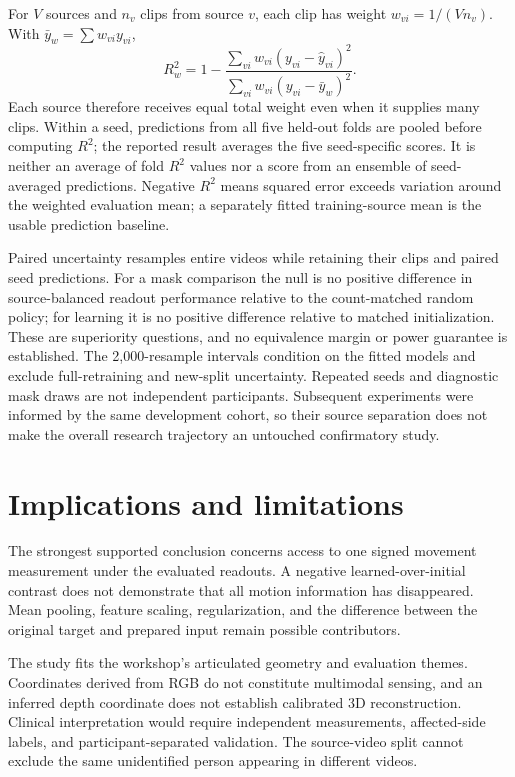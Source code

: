 \documentclass{article}
\begin{document}
For \(V\) sources and \(n_v\) clips from source \(v\), each clip has weight \(w_{vi}=1/(Vn_v)\). With \(\bar y_w=\sum w_{vi}y_{vi}\), \[
R^2_w=1-\frac{\sum_{vi}w_{vi}(y_{vi}-\hat y_{vi})^2}
{\sum_{vi}w_{vi}(y_{vi}-\bar y_w)^2}.
\] Each source therefore receives equal total weight even when it supplies many clips. Within a seed, predictions from all five held-out folds are pooled before computing \(R^2\); the reported result averages the five seed-specific scores. It is neither an average of fold \(R^2\) values nor a score from an ensemble of seed-averaged predictions. Negative \(R^2\) means squared error exceeds variation around the weighted evaluation mean; a separately fitted training-source mean is the usable prediction baseline.

Paired uncertainty resamples entire videos while retaining their clips and paired seed predictions. For a mask comparison the null is no positive difference in source-balanced readout performance relative to the count-matched random policy; for learning it is no positive difference relative to matched initialization. These are superiority questions, and no equivalence margin or power guarantee is established. The 2,000-resample intervals condition on the fitted models and exclude full-retraining and new-split uncertainty. Repeated seeds and diagnostic mask draws are not independent participants. Subsequent experiments were informed by the same development cohort, so their source separation does not make the overall research trajectory an untouched confirmatory study.

\section{Implications and limitations}\label{implications-and-limitations}

The strongest supported conclusion concerns access to one signed movement measurement under the evaluated readouts. A negative learned-over-initial contrast does not demonstrate that all motion information has disappeared. Mean pooling, feature scaling, regularization, and the difference between the original target and prepared input remain possible contributors.

The study fits the workshop's articulated geometry and evaluation themes. Coordinates derived from RGB do not constitute multimodal sensing, and an inferred depth coordinate does not establish calibrated 3D reconstruction. Clinical interpretation would require independent measurements, affected-side labels, and participant-separated validation. The source-video split cannot exclude the same unidentified person appearing in different videos.
\end{document}
